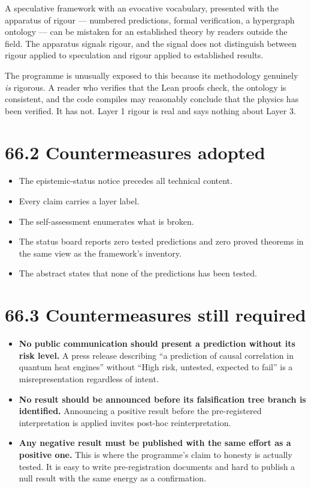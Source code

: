 \documentclass[
  11pt]{report}
\providecommand{\tightlist}{%
  \setlength{\itemsep}{0pt}\setlength{\parskip}{0pt}}
\begin{document}
A speculative framework with an evocative vocabulary, presented with the
apparatus of rigour --- numbered predictions, formal verification, a
hypergraph ontology --- can be mistaken for an established theory by
readers outside the field. The apparatus signals rigour, and the signal
does not distinguish between rigour applied to speculation and rigour
applied to established results.

The programme is unusually exposed to this because its methodology
genuinely \emph{is} rigorous. A reader who verifies that the Lean proofs
check, the ontology is consistent, and the code compiles may reasonably
conclude that the physics has been verified. It has not. Layer 1 rigour
is real and says nothing about Layer 3.

\hypertarget{countermeasures-adopted}{%
\section{66.2 Countermeasures adopted}\label{countermeasures-adopted}}

\begin{itemize}
\tightlist
\item
  The epistemic-status notice precedes all technical content.
\item
  Every claim carries a layer label.
\item
  The self-assessment enumerates what is broken.
\item
  The status board reports zero tested predictions and zero proved
  theorems in the same view as the framework's inventory.
\item
  The abstract states that none of the predictions has been tested.
\end{itemize}

\hypertarget{countermeasures-still-required}{%
\section{66.3 Countermeasures still
required}\label{countermeasures-still-required}}

\begin{itemize}
\tightlist
\item
  \textbf{No public communication should present a prediction without
  its risk level.} A press release describing ``a prediction of causal
  correlation in quantum heat engines'' without ``High risk, untested,
  expected to fail'' is a misrepresentation regardless of intent.
\item
  \textbf{No result should be announced before its falsification tree
  branch is identified.} Announcing a positive result before the
  pre-registered interpretation is applied invites post-hoc
  reinterpretation.
\item
  \textbf{Any negative result must be published with the same effort as
  a positive one.} This is where the programme's claim to honesty is
  actually tested. It is easy to write pre-registration documents and
  hard to publish a null result with the same energy as a confirmation.
\end{itemize}
\end{document}
